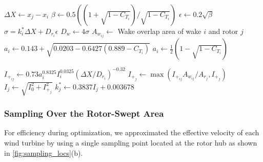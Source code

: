\documentclass[conf]{new-aiaa}
\begin{document}
{\begin{algorithm}
\begin{algorithmic}
         	\State $\Delta X \gets x_j - x_i$ 
               \State $\beta \gets 0.5((1+\sqrt{1-C_{T_i}})/\sqrt{1-C_{T_i}})$
               \State $\epsilon \gets 0.2 \sqrt{\beta}$
               \State $\sigma = k_i^*\Delta X+D_{r_i}\epsilon$
               \State $D_w \gets 4\sigma$
               \State $A_{w_{ij}} \gets$ Wake overlap area of wake $i$ and rotor $j$ 
                    \State $a_i \gets 0.143 + \sqrt{0.0203-0.6427(0.889 - C_T_i)}$ 
               \Else
                   \State $a_i \gets  \frac{1}{2}(1-\sqrt{1-C_{T_i}})$
               \EndIf
               
               \State $I_{+_{ij}} \gets 0.73 a_{i}^{0.8325} I_i^{0.0325} (\Delta X/D_{r_i})^{-0.32}$
               \State $I_{+_j} \gets \max{(I_{+_{ij}}A_{w_{ij}}/A_{r_j}, I_{+_j})}$ 
        	\EndIf
        \EndFor
        \State $I_j \gets \sqrt{I_{0}^2 + I_{+_j}^2}$ 
        \State $k_j^* \gets 0.3837I_j+0.003678 $ 
     \EndFor
   \end{algorithmic}    
\end{algorithm}

\subsubsection{Sampling Over the Rotor-Swept Area}
For efficiency during optimization, we approximated the effective velocity of each wind turbine by using a single sampling point located at the rotor hub 
as shown in \cref{fig:sampling_locs}(b).

}
\end{document}
